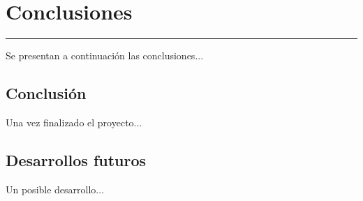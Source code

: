 \chapter{Conclusiones} \label{chap:Conclusiones}
\hrule
\vspace{3mm}

Se presentan a continuación las conclusiones...

\section{Conclusión} \label{sec:Conclusiones:Conclusion}

Una vez finalizado el proyecto...

\section{Desarrollos futuros} \label{sec:Conclusiones:Desarrollos_futuros}

Un posible desarrollo...